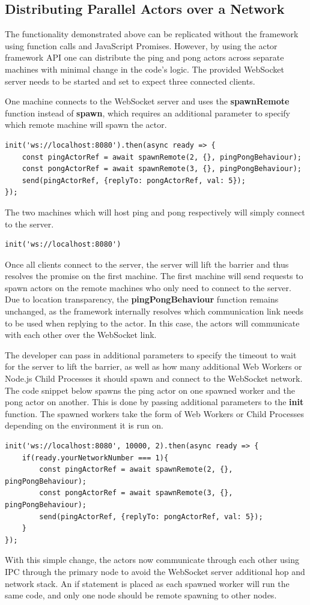 \documentclass[oneside]{um-fict}
\begin{document}
\subsection{Distributing Parallel Actors over a Network}
The functionality demonstrated above can be replicated without the framework using function calls and JavaScript Promises. However, by using the actor framework API one can distribute the ping and pong actors across separate machines with minimal change in the code's logic. The provided WebSocket server needs to be started and set to expect three connected clients. 

One machine connects to the WebSocket server and uses the \textbf{spawnRemote} function instead of \textbf{spawn}, which requires an additional parameter to specify which remote machine will spawn the actor.
\begin{lstlisting}
init('ws://localhost:8080').then(async ready => {
    const pingActorRef = await spawnRemote(2, {}, pingPongBehaviour);
    const pongActorRef = await spawnRemote(3, {}, pingPongBehaviour);
    send(pingActorRef, {replyTo: pongActorRef, val: 5});
});
\end{lstlisting}

The two machines which will host ping and pong respectively will simply connect to the server.
\begin{lstlisting}
init('ws://localhost:8080')
\end{lstlisting}

Once all clients connect to the server, the server will lift the barrier and thus resolves the promise on the first machine. The first machine will send requests to spawn actors on the remote machines who only need to connect to the server. Due to location transparency, the \textbf{pingPongBehaviour} function remains unchanged, as the framework internally resolves which communication link needs to be used when replying to the actor. In this case, the actors will communicate with each other over the WebSocket link.

The developer can pass in additional parameters to specify the timeout to wait for the server to lift the barrier, as well as how many additional Web Workers or Node.js Child Processes it should spawn and connect to the WebSocket network. The code snippet below spawns the ping actor on one spawned worker and the pong actor on another. This is done by passing additional parameters to the \textbf{init} function. The spawned workers take the form of Web Workers or Child Processes depending on the environment it is run on.
\begin{lstlisting}
init('ws://localhost:8080', 10000, 2).then(async ready => {
    if(ready.yourNetworkNumber === 1){
        const pingActorRef = await spawnRemote(2, {}, pingPongBehaviour);
        const pongActorRef = await spawnRemote(3, {}, pingPongBehaviour);
        send(pingActorRef, {replyTo: pongActorRef, val: 5});
    }
});
\end{lstlisting}
With this simple change, the actors now communicate through each other using IPC through the primary node to avoid the WebSocket server additional hop and network stack. An if statement is placed as each spawned worker will run the same code, and only one node should be remote spawning to other nodes.
\end{document}

